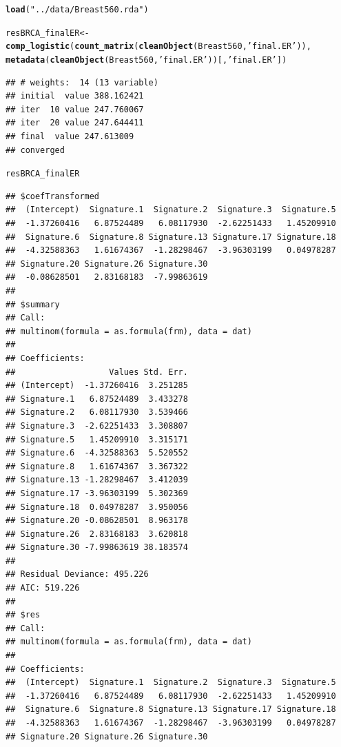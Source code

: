 \documentclass{article}\usepackage[]{graphicx}\usepackage[]{color}
\makeatletter
\newcommand{\hlstr}[1]{\textcolor[rgb]{0.192,0.494,0.8}{#1}}%
\newcommand{\hlstd}[1]{\textcolor[rgb]{0.345,0.345,0.345}{#1}}%
\newcommand{\hlkwb}[1]{\textcolor[rgb]{0.69,0.353,0.396}{#1}}%
\newcommand{\hlkwd}[1]{\textcolor[rgb]{0.737,0.353,0.396}{\textbf{#1}}}%
\newenvironment{kframe}{%
 \def\at@end@of@kframe{}%
 \ifinner\ifhmode%
  \def\at@end@of@kframe{\end{minipage}}%
  \begin{minipage}{\columnwidth}%
 \fi\fi%
 \def\FrameCommand##1{\hskip\@totalleftmargin \hskip-\fboxsep
 \colorbox{shadecolor}{##1}\hskip-\fboxsep
     \hskip-\linewidth \hskip-\@totalleftmargin \hskip\columnwidth}%
 \MakeFramed {\advance\hsize-\width
   \@totalleftmargin\z@ \linewidth\hsize
   \@setminipage}}%
 {\par\unskip\endMakeFramed%
 \at@end@of@kframe}
\newenvironment{knitrout}{}{} %
\makeatother
\begin{document}
\begin{knitrout}
\color{fgcolor}\begin{kframe}
\begin{alltt}
\hlkwd{load}\hlstd{(}\hlstr{"../data/Breast560.rda"}\hlstd{)}

\hlstd{resBRCA_finalER} \hlkwb{<-} \hlkwd{comp_logistic}\hlstd{(}\hlkwd{count_matrix}\hlstd{(}\hlkwd{cleanObject}\hlstd{(Breast560,} \hlstr{'final.ER'}\hlstd{)),}
                              \hlkwd{metadata}\hlstd{(}\hlkwd{cleanObject}\hlstd{(Breast560,} \hlstr{'final.ER'}\hlstd{))[,}\hlstr{'final.ER'}\hlstd{])}
\end{alltt}
\begin{verbatim}
## # weights:  14 (13 variable)
## initial  value 388.162421 
## iter  10 value 247.760067
## iter  20 value 247.644411
## final  value 247.613009 
## converged
\end{verbatim}
\begin{alltt}
\hlstd{resBRCA_finalER}
\end{alltt}
\begin{verbatim}
## $coefTransformed
##  (Intercept)  Signature.1  Signature.2  Signature.3  Signature.5 
##  -1.37260416   6.87524489   6.08117930  -2.62251433   1.45209910 
##  Signature.6  Signature.8 Signature.13 Signature.17 Signature.18 
##  -4.32588363   1.61674367  -1.28298467  -3.96303199   0.04978287 
## Signature.20 Signature.26 Signature.30 
##  -0.08628501   2.83168183  -7.99863619 
## 
## $summary
## Call:
## multinom(formula = as.formula(frm), data = dat)
## 
## Coefficients:
##                   Values Std. Err.
## (Intercept)  -1.37260416  3.251285
## Signature.1   6.87524489  3.433278
## Signature.2   6.08117930  3.539466
## Signature.3  -2.62251433  3.308807
## Signature.5   1.45209910  3.315171
## Signature.6  -4.32588363  5.520552
## Signature.8   1.61674367  3.367322
## Signature.13 -1.28298467  3.412039
## Signature.17 -3.96303199  5.302369
## Signature.18  0.04978287  3.950056
## Signature.20 -0.08628501  8.963178
## Signature.26  2.83168183  3.620818
## Signature.30 -7.99863619 38.183574
## 
## Residual Deviance: 495.226 
## AIC: 519.226 
## 
## $res
## Call:
## multinom(formula = as.formula(frm), data = dat)
## 
## Coefficients:
##  (Intercept)  Signature.1  Signature.2  Signature.3  Signature.5 
##  -1.37260416   6.87524489   6.08117930  -2.62251433   1.45209910 
##  Signature.6  Signature.8 Signature.13 Signature.17 Signature.18 
##  -4.32588363   1.61674367  -1.28298467  -3.96303199   0.04978287 
## Signature.20 Signature.26 Signature.30 

\end{verbatim}
\end{kframe}
\end{knitrout}
\end{document}
